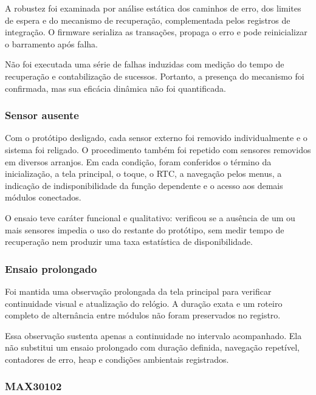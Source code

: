\documentclass[a4paper,12pt]{article}
\begin{document}
A robustez foi examinada por an\'alise est\'atica dos caminhos de erro, dos limites de espera e do mecanismo de recupera\c{c}\~ao, complementada pelos registros de integra\c{c}\~ao. O firmware serializa as transa\c{c}\~oes, propaga o erro e pode reinicializar o barramento ap\'os falha.


N\~ao foi executada uma s\'erie de falhas induzidas com medi\c{c}\~ao do tempo de recupera\c{c}\~ao e contabiliza\c{c}\~ao de sucessos. Portanto, a presen\c{c}a do mecanismo foi confirmada, mas sua efic\'acia din\^amica n\~ao foi quantificada.


\subsubsection{Sensor ausente}


Com o prot\'otipo desligado, cada sensor externo foi removido individualmente e o sistema foi religado. O procedimento tamb\'em foi repetido com sensores removidos em diversos arranjos. Em cada condi\c{c}\~ao, foram conferidos o t\'ermino da inicializa\c{c}\~ao, a tela principal, o toque, o RTC, a navega\c{c}\~ao pelos menus, a indica\c{c}\~ao de indisponibilidade da fun\c{c}\~ao dependente e o acesso aos demais m\'odulos conectados.


O ensaio teve car\'ater funcional e qualitativo: verificou se a aus\^encia de um ou mais sensores impedia o uso do restante do prot\'otipo, sem medir tempo de recupera\c{c}\~ao nem produzir uma taxa estat\'istica de disponibilidade.


\subsubsection{Ensaio prolongado}


Foi mantida uma observa\c{c}\~ao prolongada da tela principal para verificar continuidade visual e atualiza\c{c}\~ao do rel\'ogio. A dura\c{c}\~ao exata e um roteiro completo de altern\^ancia entre m\'odulos n\~ao foram preservados no registro.


Essa observa\c{c}\~ao sustenta apenas a continuidade no intervalo acompanhado. Ela n\~ao substitui um ensaio prolongado com dura\c{c}\~ao definida, navega\c{c}\~ao repet\'ivel, contadores de erro, heap e condi\c{c}\~oes ambientais registrados.


\subsubsection{MAX30102}
\end{document}
